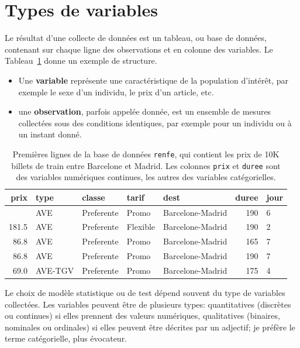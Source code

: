 \documentclass[
  11pt,
  letterpaper,
]{scrbook}
\providecommand{\tightlist}{%
  \setlength{\itemsep}{0pt}\setlength{\parskip}{0pt}}\usepackage{longtable,booktabs,array}
\theoremstyle{plain}
\theoremstyle{plain}
\theoremstyle{definition}
\theoremstyle{definition}
\theoremstyle{remark}
\begin{document}
\section{Types de variables}\label{types-de-variables}

Le résultat d'une collecte de données est un tableau, ou base de
données, contenant sur chaque ligne des observations et en colonne des
variables. Le Tableau~\ref{tbl-data-renfe} donne un exemple de
structure.

\begin{itemize}
\tightlist
\item
  Une \textbf{variable} représente une caractéristique de la population
  d'intérêt, par exemple le sexe d'un individu, le prix d'un article,
  etc.
\item
  une \textbf{observation}, parfois appelée donnée, est un ensemble de
  mesures collectées sous des conditions identiques, par exemple pour un
  individu ou à un instant donné.
\end{itemize}

\begin{longtable}[]{@{}rllllrl@{}}

\caption{\label{tbl-data-renfe}Premières lignes de la base de données
\texttt{renfe}, qui contient les prix de 10K billets de train entre
Barcelone et Madrid. Les colonnes \texttt{prix} et \texttt{duree} sont
des variables numériques continues, les autres des variables
catégorielles.}

\tabularnewline

\toprule\noalign{}
prix & type & classe & tarif & dest & duree & jour \\
\midrule\noalign{}
\endhead
\bottomrule\noalign{}
\endlastfoot
143.4 & AVE & Preferente & Promo & Barcelone-Madrid & 190 & 6 \\
181.5 & AVE & Preferente & Flexible & Barcelone-Madrid & 190 & 2 \\
86.8 & AVE & Preferente & Promo & Barcelone-Madrid & 165 & 7 \\
86.8 & AVE & Preferente & Promo & Barcelone-Madrid & 190 & 7 \\
69.0 & AVE-TGV & Preferente & Promo & Barcelone-Madrid & 175 & 4 \\

\end{longtable}

Le choix de modèle statistique ou de test dépend souvent du type de
variables collectées. Les variables peuvent être de plusieurs types:
quantitatives (discrètes ou continues) si elles prennent des valeurs
numériques, qualitatives (binaires, nominales ou ordinales) si elles
peuvent être décrites par un adjectif; je préfère le terme catégorielle,
plus évocateur.
\end{document}
